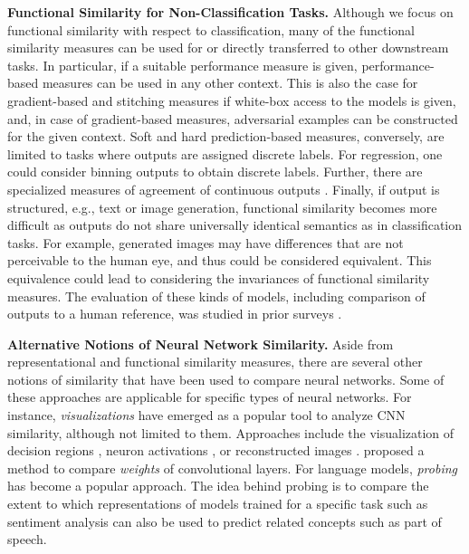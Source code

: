 \documentclass{article}
\newcommand{\citet}{\textcite}
\newcommand{\subheader}{\textbf}
\begin{document}
\begin{refsegment}
\subheader{Functional Similarity for Non-Classification Tasks.}
Although we focus on functional similarity with respect to classification, many of the functional similarity measures can be used for or directly transferred to other downstream tasks.
In particular, if a suitable performance measure is given, performance-based measures can be used in any other context.
This is also the case for gradient-based and stitching measures if white-box access to the models is given, and, in case of gradient-based measures, adversarial examples can be constructed for the given context.
Soft and hard prediction-based measures, conversely, are limited to tasks where outputs are assigned discrete labels.
For regression, one could consider binning outputs to obtain discrete labels.
Further, there are specialized measures of agreement of continuous outputs \cite{tinsley_interrater_1975,gisev_interrater_2013}.
Finally, if output is structured, e.g., text or image generation, functional similarity becomes more difficult as outputs do not share universally identical semantics as in classification tasks.
For example, generated images may have differences that are not perceivable to the human eye, and thus could be considered equivalent.
This equivalence could lead to considering the invariances of functional similarity measures.
The evaluation of these kinds of models, including comparison of outputs to a human reference, was studied in prior surveys \cite{borji_pros_2018,celikyilmaz_evaluation_2021}.

\subheader{Alternative Notions of Neural Network Similarity.}
Aside from representational and functional similarity measures, there are several other notions of similarity that have been used to compare neural networks.
Some of these approaches are applicable for specific types of neural networks.
For instance, \emph{visualizations} have emerged as a popular tool to analyze CNN similarity, although not limited to them.
Approaches include the visualization of decision regions \cite{somepalli_can_2022}, neuron activations \cite{bau_network_2017}, or reconstructed images \cite{mahendran_understanding_2014}.
\citet{chen_inner-product_2023} proposed a method to compare \emph{weights} of convolutional layers.
For language models, \emph{probing} \cite{belinkov_probing_2021} has become a popular approach.
The idea behind probing is to compare the extent to which representations of models trained for a specific task such as sentiment analysis can also be used to predict related concepts such as part of speech.


\end{refsegment}
\end{document}
